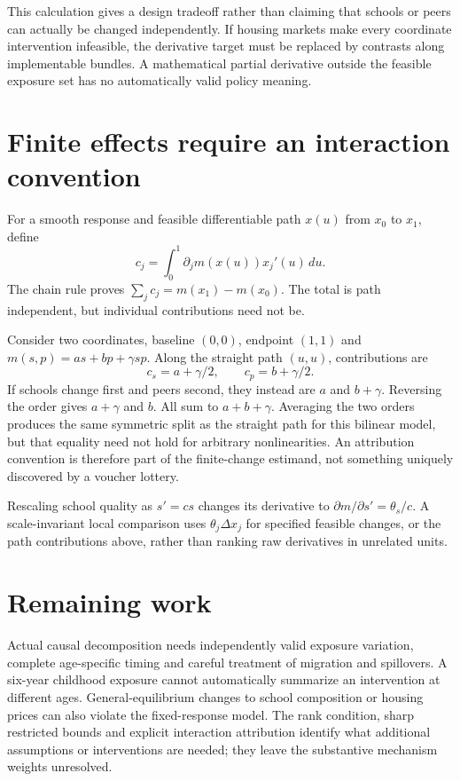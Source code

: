 \documentclass[11pt]{article}
\begin{document}
This calculation gives a design tradeoff rather than claiming that schools or peers can actually be changed independently. If housing markets make every coordinate intervention infeasible, the derivative target must be replaced by contrasts along implementable bundles. A mathematical partial derivative outside the feasible exposure set has no automatically valid policy meaning.

\section*{Finite effects require an interaction convention}
For a smooth response and feasible differentiable path $x(u)$ from $x_0$ to $x_1$, define
\[
 c_j=\int_0^1\partial_jm(x(u))x_j'(u)\,du.
\]
The chain rule proves $\sum_jc_j=m(x_1)-m(x_0)$. The total is path independent, but individual contributions need not be.

Consider two coordinates, baseline $(0,0)$, endpoint $(1,1)$ and
$m(s,p)=as+bp+\gamma sp$. Along the straight path $(u,u)$, contributions are
\[
 c_s=a+\gamma/2,\qquad c_p=b+\gamma/2.
\]
If schools change first and peers second, they instead are $a$ and $b+\gamma$. Reversing the order gives $a+\gamma$ and $b$. All sum to $a+b+\gamma$. Averaging the two orders produces the same symmetric split as the straight path for this bilinear model, but that equality need not hold for arbitrary nonlinearities. An attribution convention is therefore part of the finite-change estimand, not something uniquely discovered by a voucher lottery.

Rescaling school quality as $s'=cs$ changes its derivative to $\partial m/\partial s'=\theta_s/c$. A scale-invariant local comparison uses $\theta_j\Delta x_j$ for specified feasible changes, or the path contributions above, rather than ranking raw derivatives in unrelated units.

\section*{Remaining work}
Actual causal decomposition needs independently valid exposure variation, complete age-specific timing and careful treatment of migration and spillovers. A six-year childhood exposure cannot automatically summarize an intervention at different ages. General-equilibrium changes to school composition or housing prices can also violate the fixed-response model. The rank condition, sharp restricted bounds and explicit interaction attribution identify what additional assumptions or interventions are needed; they leave the substantive mechanism weights unresolved.
\end{document}
